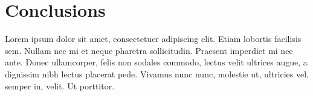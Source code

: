 
\section{Conclusions}

\begin{frame}[plain]
  \begin{quag}[Conclusions]
    Lorem ipsum dolor sit amet, consectetuer adipiscing elit.
    Etiam lobortis facilisis sem. Nullam nec mi et neque
    pharetra sollicitudin. Praesent imperdiet mi nec ante. Donec
    ullamcorper, felis non sodales commodo, lectus velit ultrices
    augue, a dignissim nibh lectus placerat pede. Vivamus nunc
    nunc, molestie ut, ultricies vel, semper in, velit. Ut porttitor.
  \end{quag}
\end{frame}


